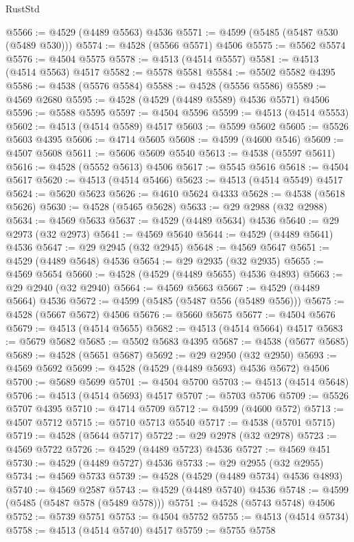 \begin{lexlean}{RustStd}
\begin{coremodule}
@5566 := @4529 (@4489 @5563) @4536
@5571 := @4599 (@5485 (@5487 @530 (@5489 @530)))
@5574 := @4528 (@5566 @5571) @4506
@5575 := @5562 @5574
@5576 := @4504 @5575
@5578 := @4513 (@4514 @5557)
@5581 := @4513 (@4514 @5563) @4517
@5582 := @5578 @5581
@5584 := @5502 @5582 @4395
@5586 := @4538 (@5576 @5584)
@5588 := @4528 (@5556 @5586)
@5589 := @4569 @2680
@5595 := @4528 (@4529 (@4489 @5589) @4536 @5571) @4506
@5596 := @5588 @5595
@5597 := @4504 @5596
@5599 := @4513 (@4514 @5553)
@5602 := @4513 (@4514 @5589) @4517
@5603 := @5599 @5602
@5605 := @5526 @5603 @4395
@5606 := @4714 @5605
@5608 := @4599 (@4600 @546)
@5609 := @4507 @5608
@5611 := @5606 @5609 @5540
@5613 := @4538 (@5597 @5611)
@5616 := @4528 (@5552 @5613) @4506
@5617 := @5545 @5616
@5618 := @4504 @5617
@5620 := @4513 (@4514 @5466)
@5623 := @4513 (@4514 @5549) @4517
@5624 := @5620 @5623
@5626 := @4610 @5624 @4333
@5628 := @4538 (@5618 @5626)
@5630 := @4528 (@5465 @5628)
@5633 := @29 @2988 (@32 @2988)
@5634 := @4569 @5633
@5637 := @4529 (@4489 @5634) @4536
@5640 := @29 @2973 (@32 @2973)
@5641 := @4569 @5640
@5644 := @4529 (@4489 @5641) @4536
@5647 := @29 @2945 (@32 @2945)
@5648 := @4569 @5647
@5651 := @4529 (@4489 @5648) @4536
@5654 := @29 @2935 (@32 @2935)
@5655 := @4569 @5654
@5660 := @4528 (@4529 (@4489 @5655) @4536 @4893)
@5663 := @29 @2940 (@32 @2940)
@5664 := @4569 @5663
@5667 := @4529 (@4489 @5664) @4536
@5672 := @4599 (@5485 (@5487 @556 (@5489 @556)))
@5675 := @4528 (@5667 @5672) @4506
@5676 := @5660 @5675
@5677 := @4504 @5676
@5679 := @4513 (@4514 @5655)
@5682 := @4513 (@4514 @5664) @4517
@5683 := @5679 @5682
@5685 := @5502 @5683 @4395
@5687 := @4538 (@5677 @5685)
@5689 := @4528 (@5651 @5687)
@5692 := @29 @2950 (@32 @2950)
@5693 := @4569 @5692
@5699 := @4528 (@4529 (@4489 @5693) @4536 @5672) @4506
@5700 := @5689 @5699
@5701 := @4504 @5700
@5703 := @4513 (@4514 @5648)
@5706 := @4513 (@4514 @5693) @4517
@5707 := @5703 @5706
@5709 := @5526 @5707 @4395
@5710 := @4714 @5709
@5712 := @4599 (@4600 @572)
@5713 := @4507 @5712
@5715 := @5710 @5713 @5540
@5717 := @4538 (@5701 @5715)
@5719 := @4528 (@5644 @5717)
@5722 := @29 @2978 (@32 @2978)
@5723 := @4569 @5722
@5726 := @4529 (@4489 @5723) @4536
@5727 := @4569 @451
@5730 := @4529 (@4489 @5727) @4536
@5733 := @29 @2955 (@32 @2955)
@5734 := @4569 @5733
@5739 := @4528 (@4529 (@4489 @5734) @4536 @4893)
@5740 := @4569 @2587
@5743 := @4529 (@4489 @5740) @4536
@5748 := @4599 (@5485 (@5487 @578 (@5489 @578)))
@5751 := @4528 (@5743 @5748) @4506
@5752 := @5739 @5751
@5753 := @4504 @5752
@5755 := @4513 (@4514 @5734)
@5758 := @4513 (@4514 @5740) @4517
@5759 := @5755 @5758

\end{coremodule}
\end{lexlean}

